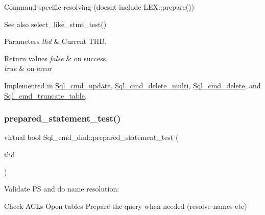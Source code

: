 Command-\/specific resolving (doesn\textquotesingle{}t include L\+E\+X\+::prepare())

\begin{DoxySeeAlso}{See also}
select\+\_\+like\+\_\+stmt\+\_\+test()
\end{DoxySeeAlso}

\begin{DoxyParams}{Parameters}
{\em thd} & Current T\+HD.\\
\hline
\end{DoxyParams}

\begin{DoxyRetVals}{Return values}
{\em false} & on success. \\
\hline
{\em true} & on error \\
\hline
\end{DoxyRetVals}


Implemented in \mbox{\hyperlink{classSql__cmd__update_af3b765bea10980878c0d4c0e677ce88f}{Sql\+\_\+cmd\+\_\+update}}, \mbox{\hyperlink{classSql__cmd__delete__multi_af069c73c8b62527f3bf8de0b9ce45297}{Sql\+\_\+cmd\+\_\+delete\+\_\+multi}}, \mbox{\hyperlink{classSql__cmd__delete_ad761a1c8d8c0412fddd38a3303986806}{Sql\+\_\+cmd\+\_\+delete}}, and \mbox{\hyperlink{classSql__cmd__truncate__table_a330e8a3864e8646a4ac4053c8a93db6d}{Sql\+\_\+cmd\+\_\+truncate\+\_\+table}}.

\mbox{\label{classSql__cmd__dml_af36dc69e855d0e48d0e79002576907a4}} 
\subsubsection{\texorpdfstring{prepared\+\_\+statement\+\_\+test()}{prepared\_statement\_test()}}
{\footnotesize\ttfamily virtual bool Sql\+\_\+cmd\+\_\+dml\+::prepared\+\_\+statement\+\_\+test (\begin{DoxyParamCaption}\item[{T\+HD $\ast$}]{thd }\end{DoxyParamCaption})\hspace{0.3cm}{\ttfamily [pure virtual]}}

Validate PS and do name resolution\+:

Check A\+C\+Ls Open tables Prepare the query when needed (resolve names etc)

